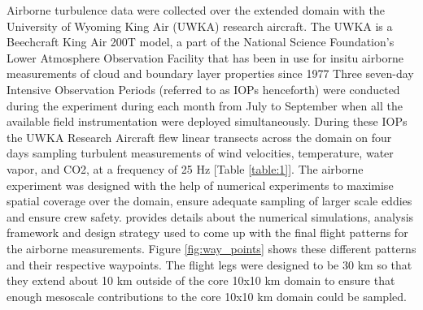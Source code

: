\documentclass[draft]{agujournal2019}
\begin{document}
Airborne turbulence data were collected over the extended domain with the University of Wyoming King Air (UWKA) research aircraft. The UWKA is a Beechcraft King Air 200T model, a part of the National Science Foundation's Lower Atmosphere Observation Facility that has been in use for insitu airborne measurements of cloud and boundary layer properties since 1977 \cite{rodi2011king, wang_single_2012} Three seven-day Intensive Observation Periods (referred to as IOPs henceforth) were conducted during the experiment during each month from July to September when all the available field instrumentation were deployed simultaneously. During these IOPs the UWKA Research Aircraft flew linear transects across the domain on four days sampling turbulent measurements of wind velocities, temperature, water vapor, and CO2,  at a frequency of 25 Hz [Table \ref{table:1}]. The airborne experiment was designed with the help of numerical experiments to maximise spatial coverage over the domain, ensure adequate sampling of larger scale eddies and ensure crew safety.  provides details about the numerical simulations, analysis framework and design strategy used to come up with the final flight patterns for the airborne measurements. Figure \ref{fig:way_points} shows these different patterns and their respective waypoints. The flight legs were designed to be 30 km so that they extend about 10 km outside of the core 10x10 km domain to ensure that enough mesoscale contributions to the core 10x10 km domain could be sampled.
\end{document}
